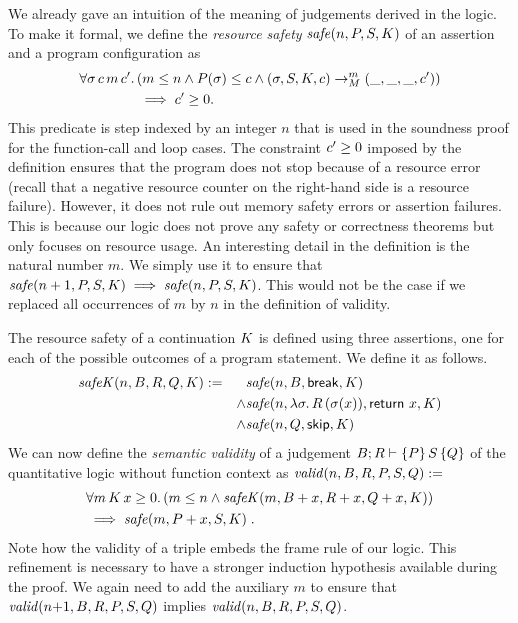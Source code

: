 \documentclass[nocopyrightspace,preprint]{sigplanconf}
\begin{document}
We already gave an intuition of the meaning of judgements
derived in the logic.  To make it formal, we define the
\emph{resource safety} $\mathit{safe}(n,P,S,K)$ of an assertion
and a program configuration as
\begin{align*}
  \forall \sigma \, c \, m \, c' .\,&
  (m \le n \land P(\sigma) \le c \land
    (\sigma, S, K, c) \to_{M}^m (\_, \_, \_, c')) \\
  &\implies c' \ge 0.
\end{align*}
This predicate is step indexed by an integer $n$ that is used in the
soundness proof for the function-call and loop cases.  The constraint
$c' \geq 0$ imposed by the definition ensures that the program does
not stop because of a resource error (recall that a negative resource
counter on the right-hand side is a resource failure).  However, it
does not rule out memory safety errors or assertion failures. This is
because our logic does not prove any safety or correctness theorems
but only focuses on resource usage.
%
An interesting detail in the definition is the natural number $m$.  We
simply use it to ensure that $\mathit{safe}(n+1,P,S,K) \implies \mathit{safe}(n,P,S,K) $.  This would not be the case if we replaced all occurrences of
$m$ by $n$ in the definition of validity.

The resource safety of a continuation $K$ is defined using three
assertions, one for each of the possible outcomes of a program
statement.  We define it as follows.
\begin{align*}
\mathit{safeK}(n,B,R,Q,K) & := & & \mathit{safe}(n,B,\mathsf{break},K) \\
& & \land& \mathit{safe}(n,\lambda \sigma.\,R\,(\sigma(x)),\mathsf{return}~x,K) \\
& & \land& \mathit{safe}(n,Q,\mathsf{skip},K)
\end{align*}
%
We can now define the \emph{semantic validity} of a judgement $B; R
\vdash \{P\}\, S\, \{Q\}$ of the quantitative logic without function
context as $\mathit{valid}(n,B,R,P,S,Q) :=$
\begin{align*}
& \forall m \, K \, x \geq 0 .\, (m \le n \land \mathit{safeK}(m,B+x,R+x,Q+x,K)) \\
& \implies \mathit{safe}(m,P+x,S,K) \; .
\end{align*}
Note how the validity of a triple embeds the frame rule of
our logic. This refinement is necessary to have a stronger
induction hypothesis available during the proof.
%
We again need to add the auxiliary $m$ to ensure that $\mathit{valid}(n{+}1,B,R,P,S,Q)$ implies $\mathit{valid}(n,B,R,P,S,Q)$.
\end{document}
